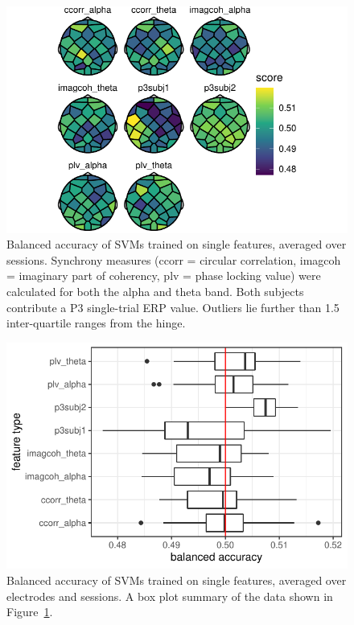 \begin{figure}[!htpb]
  \includegraphics[width=\linewidth]{../stats/results/svm_indiv_topo.pdf}
  \caption{Balanced accuracy of SVMs trained on single features, averaged over sessions. Synchrony measures (ccorr = circular correlation, imagcoh = imaginary part of coherency, plv = phase locking value) were calculated for both the alpha and theta band. Both subjects contribute a P3 single-trial ERP value. Outliers lie further than 1.5 inter-quartile ranges from the hinge.}
  \label{fig:svm_indiv_topo}
\end{figure}

\begin{figure}[!htpb]
  \includegraphics[width=\linewidth]{../stats/results/svm_indiv.pdf}
  \caption{Balanced accuracy of SVMs trained on single features, averaged over electrodes and sessions. A box plot summary of the data shown in Figure~\ref{fig:svm_indiv_topo}.}
  \label{fig:svm_indiv}
\end{figure}


